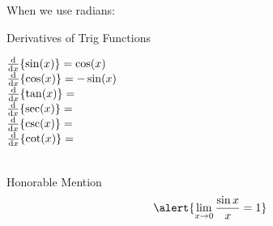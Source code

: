 %
%
%
\begin{frame}[t]\label{trigderivs}
When we use radians:
\begin{block}{Derivatives of Trig Functions}
\begin{multicols}{2}
\indent\alert{$\frac{\text{d}}{\text{d}x}\{\sin(x)\}=\cos(x)$\\
$\frac{\text{d}}{\text{d}x}\{\cos(x)\}=-\sin(x)$}\\
$\frac{\text{d}}{\text{d}x}\{\tan(x)\}=$\\

$\frac{\text{d}}{\text{d}x}\{\sec(x)\}=$\\
$\frac{\text{d}}{\text{d}x}\{\csc(x)\}=$\\
$\frac{\text{d}}{\text{d}x}\{\cot(x)\}=$\\~
\end{multicols}
\end{block}

\begin{block}{Honorable Mention}
\[\alert{\lim_{x \rightarrow 0 }\frac{\sin x}{x} = 1}\]
\end{block}

\end{frame}
